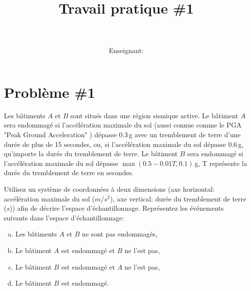 \documentclass[letterpaper]{article}
\author{\courseS \\ \deptS\\ Enseignant: \profS\\[6pt] \dateS}
\date{}
\newcommand{\titleS}{Travail pratique \#1}
\begin{document}
\title{\titleS }
\section*{Problème \#1}

Les b\^atiments $A$ et $B$ sont situés dans une région sismique active. Le b\^atiment $A$ sera endommagé si l'accélération maximale du sol (aussi connue comme le PGA "Peak Ground Acceleration" ) dépasse 0.3\,g avec un tremblement de terre d'une durée de plus de 15 secondes, ou, si l'accélération maximale du sol dépasse 0.6\,g, qu'importe la durée du tremblement de terre. Le b\^atiment $B$ sera endommagé si l'accélération maximale du sol dépasse $\operatorname{max}(0.5-0.01T, 0.1)$\,g, T représente la durée du tremblement de terre en secondes.

Utilisez un système de coordonnées à deux dimensions (axe horizontal: accélération maximale du sol ($m/s^2$), axe vertical: durée du tremblement de terre ($s$)) afin de décrire l'espace d'échantillonnage. Représentez les événements suivants dans l'espace d'échantillonnage: 
\begin{enumerate}[a)]
\item Les bâtiments $A$ et $B$ ne sont pas endommagés,
\item Le bâtiment $A$ est endommagé et $B$ ne l'est pas,
\item Le bâtiment $B$ est endommagé et $A$ ne l'est pas,
\item Le bâtiment $B$ est endommagé.
\end{enumerate}

%
%
\end{document}
